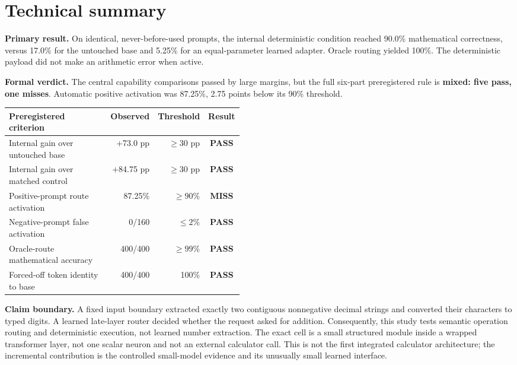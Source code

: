 \documentclass[11pt]{article}
\newcommand{\pass}{\textcolor{passgreen}{\textbf{PASS}}}
\newcommand{\miss}{\textcolor{failred}{\textbf{MISS}}}
\begin{document}
\section*{Technical summary}

\noindent\textbf{Primary result.} On identical, never-before-used prompts, the
internal deterministic condition reached 90.0\% mathematical correctness,
versus 17.0\% for the untouched base and 5.25\% for an equal-parameter learned
adapter. Oracle routing yielded 100\%. The deterministic payload did not make
an arithmetic error when active.

\medskip
\noindent\textbf{Formal verdict.} The central capability comparisons passed by
large margins, but the full six-part preregistered rule is
\textcolor{warningorange}{\textbf{mixed: five pass, one misses}}. Automatic
positive activation was 87.25\%, 2.75 points below its 90\% threshold.

\begin{center}
\small
\begin{tabular}{p{0.46\linewidth}rrc}
\toprule
Preregistered criterion & Observed & Threshold & Result\\
\midrule
Internal gain over untouched base & +73.0 pp & $\geq 30$ pp & \pass\\
Internal gain over matched control & +84.75 pp & $\geq 30$ pp & \pass\\
Positive-prompt route activation & 87.25\% & $\geq 90\%$ & \miss\\
Negative-prompt false activation & 0/160 & $\leq 2\%$ & \pass\\
Oracle-route mathematical accuracy & 400/400 & $\geq 99\%$ & \pass\\
Forced-off token identity to base & 400/400 & 100\% & \pass\\
\bottomrule
\end{tabular}
\end{center}

\noindent\textbf{Claim boundary.} A fixed input boundary extracted exactly two
contiguous nonnegative decimal strings and converted their characters to typed
digits. A learned late-layer router decided whether the request asked for
addition. Consequently, this study tests semantic operation routing and
deterministic execution, not learned number extraction. The exact cell is a
small structured module inside a wrapped transformer layer, not one scalar
neuron and not an external calculator call. This is not the first integrated
calculator architecture; the incremental contribution is the controlled
small-model evidence and its unusually small learned interface.
\end{document}
